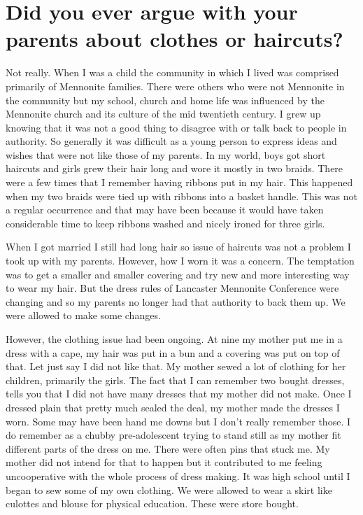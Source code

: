 \section{Did you ever argue with your parents about clothes or haircuts?}
Not really.
When I was a child the community in which I lived was comprised primarily of Mennonite families.
There were others who were not Mennonite in the community but my school, church and home life was influenced by the Mennonite church and its culture of the mid twentieth century.
I grew up knowing that it was not a good thing to disagree with or talk back to people in authority.
So generally it was difficult as a young person to express ideas and wishes that were not like those of my parents.
In my world, boys got short haircuts and girls grew their hair long and wore it mostly in two braids.
There were a few times that I remember having ribbons put in my hair.
This happened when my two braids were tied up with ribbons into a basket handle.
This was not a regular occurrence and that may have been because it would have taken considerable time to keep ribbons washed and nicely ironed for three girls.

When I got married I still had long hair so issue of haircuts was not a problem I took up with my parents.
However, how I worn it was a concern.
The temptation was to get a smaller and smaller covering and try new and more interesting way to wear my hair.
But the dress rules of Lancaster Mennonite Conference were changing and so my parents no longer had that authority to back them up.
We were allowed to make some changes.

However, the clothing issue had been ongoing.
At nine my mother put me in a dress with a cape, my hair was put in a bun and a covering was put on top of that.
Let just say I did not like that.
My mother sewed a lot of clothing for her children, primarily the girls.
The fact that I can remember two bought dresses, tells you that I did not have many dresses that my mother did not make.
Once I dressed plain that pretty much sealed the deal, my mother made the dresses I worn.
Some may have been hand me downs but I don't really remember those.
I do remember as a chubby pre-adolescent trying to stand still as my mother fit different parts of the dress on me.
There were often pins that stuck me.
My mother did not intend for that to happen but it contributed to me feeling uncooperative with the whole process of dress making.
It was high school until I began to sew some of my own clothing.
We were allowed to wear a skirt like culottes and blouse for physical education.
These were store bought.

